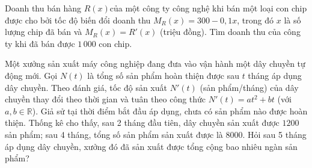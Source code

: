 \begin{vd}Doanh thu bán hàng $R(x)$của một công ty công nghệ khi bán một loại con chip được cho bởi tốc độ biến đổi doanh thu $M_R(x) = 300 - 0,1x$, trong đó $x$ là số lượng chip đã bán và $M_R(x) = R'(x)$ (triệu đồng). Tìm doanh thu của công ty khi đã bán được $1\,000$ con chip.
\end{vd}
\begin{vd}
 Một xưởng sản xuất máy công nghiệp đang đưa vào vận hành một dây chuyền tự động mới. Gọi $N(t)$ là tổng số sản phẩm hoàn thiện được sau $t$ tháng áp dụng dây chuyền. Theo đánh giá, tốc độ sản xuất $N'(t)$ (sản phẩm/tháng) của dây chuyền thay đổi theo thời gian và tuân theo công thức $N'(t) = at^2 + bt$ (với $a, b \in \mathbb{R}$). Giả sử tại thời điểm bắt đầu áp dụng, chưa có sản phẩm nào được hoàn thiện. Thống kê cho thấy, sau 2 tháng đầu tiên, dây chuyền sản xuất được $1200$ sản phẩm; sau 4 tháng, tổng số sản phẩm sản xuất được là $8000$. Hỏi sau 5 tháng áp dụng dây chuyền, xưởng đó đã sản xuất được tổng cộng bao nhiêu ngàn sản phẩm?
\end{vd}
